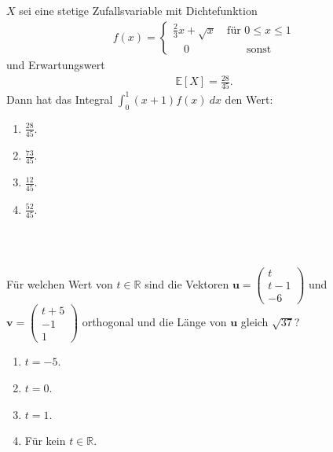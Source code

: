 \subsection*{}
$ X $ sei eine stetige Zufallsvariable mit Dichtefunktion
\begin{align*}
f(x) = 
\begin{cases}
\frac{2}{3} x + \sqrt{x} &\ \textrm{für } 0 \leq x \leq 1\\
\quad 0 &\qquad \textrm{sonst}
\end{cases}
\end{align*}
und Erwartungswert
\begin{align*}
\mathbb{E}[X] = \frac{28}{45}.
\end{align*}
Dann hat das Integral $ \int_0^1 (x+1) f(x) \ dx $ den Wert:
\renewcommand{\labelenumi}{(\alph{enumi})}
\begin{enumerate}
\item 
$\frac{28}{45}$.
\item
$\frac{73}{45}$.
\item
$\frac{12}{45}$.
\item
$\frac{52}{45}$.
\end{enumerate}
\ \\
\subsection*{}
Für welchen Wert von $ t \in \mathbb{R} $ sind die Vektoren $ \textbf{u} = \begin{pmatrix}
t \\ t-1 \\ -6
\end{pmatrix} $ und $ \textbf{v} = \begin{pmatrix}
t+5 \\ -1 \\ 1
\end{pmatrix} $ orthogonal und die Länge von $ \textbf{u} $ gleich $ \sqrt{37} $?
\renewcommand{\labelenumi}{(\alph{enumi})}
\begin{enumerate}
	\item 
	$t = -5$.
	\item
	$t = 0$.
	\item
	$ t= 1 $.
	\item
	Für kein $ t \in \mathbb{R} $.	
\end{enumerate}

\newpage
